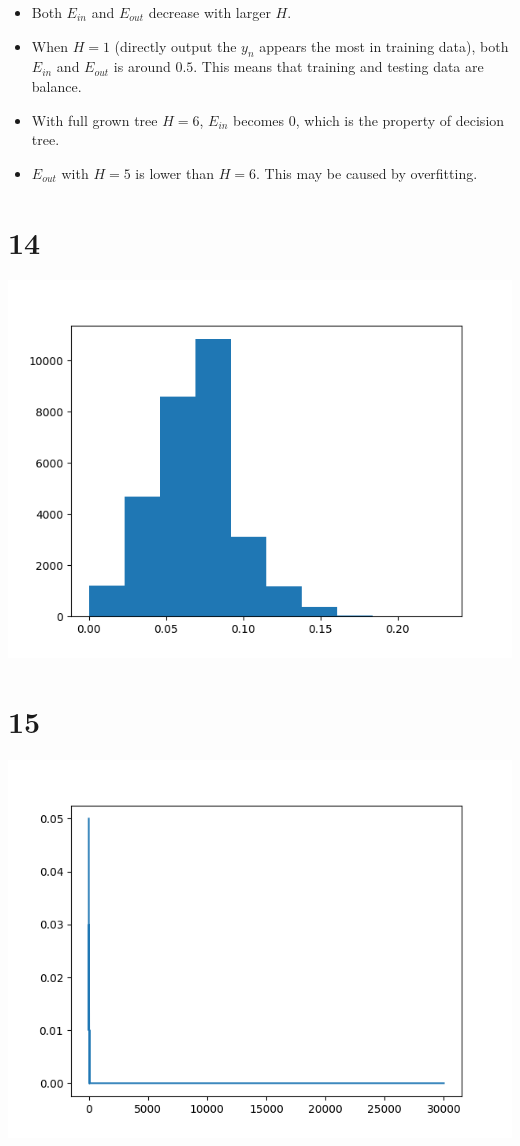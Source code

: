 \documentclass[12pt]{article}
\begin{document}
\begin{itemize}
\item Both $E_{in}$ and $E_{out}$ decrease with larger $H$. 
\item When $H=1$ (directly output the $y_n$ appears the most in training data), 
both $E_{in}$ and $E_{out}$ is around $0.5$. This means that training and testing data are balance.
\item With full grown tree $H=6$, $E_{in}$ becomes $0$, which is the property of decision tree.
\item $E_{out}$ with $H=5$ is lower than $H=6$. This may be caused by overfitting.
\end{itemize}

\section*{14}
\begin{center}
    \includegraphics[scale=0.5]{p14.png}
\end{center}

\section*{15}
\begin{center}
    \includegraphics[scale=0.5]{p15.png}
\end{center}
\end{document}
